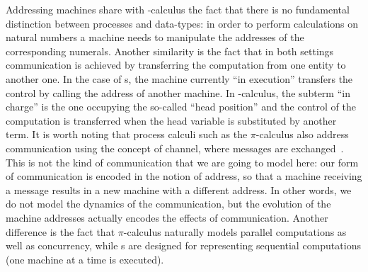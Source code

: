 Addressing machines share with \lam-calculus the fact that there is no fundamental distinction between processes and data-types: in order to perform calculations on natural numbers a machine needs to manipulate the addresses of the corresponding numerals.
Another similarity is the fact that in both settings communication is achieved by transferring the computation from one entity to another one.
In the case of \am s, the machine currently ``in execution'' transfers the control by calling the address of another machine. In \lam-calculus, the subterm ``in charge'' is the one occupying the so-called ``head position'' and the control of the computation is transferred when the head variable is substituted by another term.
It is worth noting that process calculi such as the $\pi$-calculus also address communication using the concept of channel, where messages are exchanged~\cite{Milner99,Sangiorgi01}. This is not the kind of communication that we are going to model here: our form of communication is encoded in the notion of address, so that a machine receiving a message results in a new machine with a different address. In other words, we do not model the dynamics of the communication, but the evolution of the machine addresses actually encodes the effects of communication.
Another difference is the fact that $\pi$-calculus naturally models parallel computations as well as concurrency, while \am s are designed for representing sequential computations (one machine at a time is executed).

